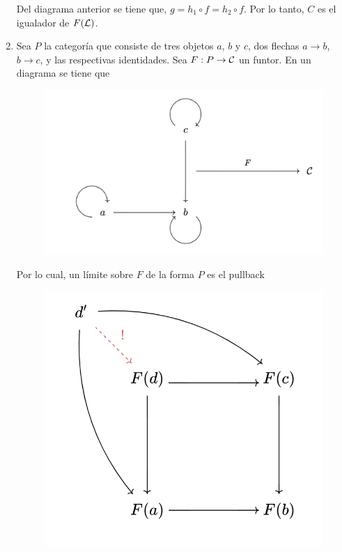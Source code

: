 \begin{ejp}
\begin{enumerate}
\begin{figure}[H]
        \end{figure}
        Del diagrama anterior se tiene que, $g=h_1\circ f=h_2\circ f$. Por lo tanto, $C$ es el igualador de $F({\mathcal L})$.
        \item Sea $P$ la categoría que consiste de tres objetos $a$, $b$ y $c$, dos flechas $a\to b$, $b\to c$, y las respectivas identidades. Sea $F:P\to{\mathcal C}$ un funtor. En un diagrama se tiene que
        \begin{figure}[H]
            \centering
            \includegraphics[width=0.6\linewidth]{img/diagrama8.png}
        \end{figure}
       Por lo cual, un límite sobre $F$ de la forma $P$ es el pullback
       \begin{figure}[H]
           \centering
           \includegraphics[width=0.38\linewidth]{img/diagrama9.png}
       \end{figure}
    \end{enumerate}
\end{ejp}
